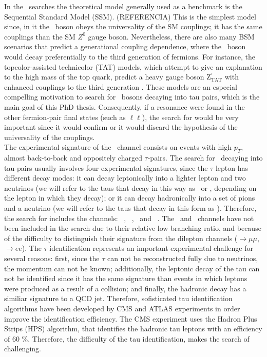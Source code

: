 In the \Zprime~searches the theoretical model generally used as a benchmark is the Sequential Standard Model (SSM). (REFERENCIA)
This is the simplest model since, in it the \Zprime~boson obeys the 
universality of the SM couplings; it has the same couplings than the SM $Z^{0}$ gauge boson. Nevertheless, there are 
also many BSM scenarios that predict a generational coupling dependence, where the \Zprime~boson 
would decay preferentially to the third generation of fermions. For instance, 
the topcolor-assisted technicolor (TAT) models, which attempt to give an explanation to the high mass of the top quark,
predict a heavy gauge boson Z$^{\prime}_{\text{TAT}}$ with enhanced couplings to the third generation \cite{Langacker:2008yv}. These models 
are an especial compelling motivation to search for \Zprime~bosons decaying into tau pairs, which is the main goal of this PhD 
thesis. Consequently, if a resonance were found in the other fermion-pair final states (such as $\ell\ell$), the search for 
\Zprimetotautau would be very important since it would confirm or it would discard 
the hypothesis of the universality of the couplings. \\

The experimental signature of the \Zprimetotautau~channel consists on events with high $p_{T}$, almost
back-to-back and oppositely charged $\tau$-pairs. The search for \Zprime~decaying into tau-pairs 
usually involves four experimental signatures, since the $\tau$ lepton has different decay modes: it 
can decay leptonically into a lighter lepton and two neutrinos (we will refer to the taus that decay in 
this way as \taue~or \taumu, depending on the lepton in which they decay); 
or it can decay hadronically into a set of pions and a neutrino (we will refer to the taus that decay in this form
as \tauh). Therefore, the search for \Zprimetotautau includes 
the channels: \taue\tauh~, \taumu\tauh~, \taue\taumu~and \tauh\tauh~. The \taue\taue~and \taumu\taumu~channels
have not been included in the search due to their relative low branching ratio, and because of the difficulty to
distinguish their signature from the dilepton channels (\Zprime$\rightarrow \mu\mu$, \Zprime$\rightarrow ee$). The $\tau$ 
identification represents an important experimental challenge for several reasons: first, since 
the $\tau$ can not be reconstructed fully due to neutrinos, the momentum can not be known; additionally, the leptonic decay of 
the tau can not be identified since it has the same signature than events in which leptons were produced as a result of 
a collision; and finally, the hadronic decay has a similiar signature to a QCD jet. Therefore, sofisticated tau 
identification algorithms have been developed by CMS and ATLAS experiments in order improve the identification 
efficiency. The CMS experiment uses the Hadron Plus Strips (HPS) algorithm, that 
identifies the hadronic tau leptons with an efficiency of 60 $\%$. Therefore, the difficulty of the tau 
identification, makes the search of \Zprimetotautau challenging. \\

